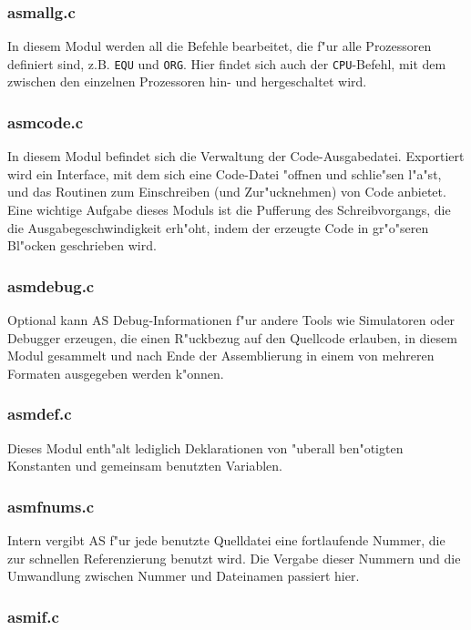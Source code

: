 \documentclass[12pt,a4paper,twoside]{report}
\newcommand{\tty}[1]{{\tt #1}}
\begin{document}
{\subsubsection{asmallg.c}

In diesem Modul werden all die Befehle bearbeitet, die f"ur alle Prozessoren
definiert sind, z.B. \tty{EQU} und \tty{ORG}.  Hier findet sich auch der
\tty{CPU}-Befehl, mit dem zwischen den einzelnen Prozessoren hin- und
hergeschaltet wird.

\subsubsection{asmcode.c}

In diesem Modul befindet sich die Verwaltung der Code-Ausgabedatei. 
Exportiert wird ein Interface, mit dem sich eine Code-Datei "offnen
und schlie"sen l"a"st, und das Routinen zum Einschreiben (und
Zur"ucknehmen) von Code anbietet.  Eine wichtige Aufgabe dieses Moduls
ist die Pufferung des Schreibvorgangs, die die Ausgabegeschwindigkeit
erh"oht, indem der erzeugte Code in gr"o"seren Bl"ocken geschrieben wird.

\subsubsection{asmdebug.c}

Optional kann AS Debug-Informationen f"ur andere Tools wie Simulatoren
oder Debugger erzeugen, die einen R"uckbezug auf den Quellcode erlauben,
in diesem Modul gesammelt und nach Ende der Assemblierung in einem von
mehreren Formaten ausgegeben werden k"onnen.

\subsubsection{asmdef.c}

Dieses Modul enth"alt lediglich Deklarationen von "uberall ben"otigten
Konstanten und gemeinsam benutzten Variablen.

\subsubsection{asmfnums.c}

Intern vergibt AS f"ur jede benutzte Quelldatei eine fortlaufende Nummer,
die zur schnellen Referenzierung benutzt wird.  Die Vergabe dieser Nummern
und die Umwandlung zwischen Nummer und Dateinamen passiert hier.

\subsubsection{asmif.c}

}
\end{document}
